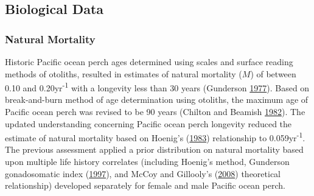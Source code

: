 \documentclass[12pt,]{article}
\begin{document}
\subsection{Biological Data}\label{biological-data}

\subsubsection{Natural Mortality}\label{natural-mortality}

Historic Pacific ocean perch ages determined using scales and surface
reading methods of otoliths, resulted in estimates of natural mortality
(\(M\)) of between 0.10 and 0.20yr\textsuperscript{-1} with a longevity
less than 30 years (Gunderson
\protect\hyperlink{ref-gunderson_population_1977}{1977}). Based on
break-and-burn method of age determination using otoliths, the maximum
age of Pacific ocean perch was revised to be 90 years (Chilton and
Beamish \protect\hyperlink{ref-chilton_age_1982}{1982}). The updated
understanding concerning Pacific ocean perch longevity reduced the
estimate of natural mortality based on Hoenig's
(\protect\hyperlink{ref-hoenig_empirical_1983}{1983}) relationship to
0.059yr\textsuperscript{-1}. The previous assessment applied a prior
distribution on natural mortality based upon multiple life history
correlates (including Hoenig's method, Gunderson gonadosomatic index
(\protect\hyperlink{ref-gunderson_trade-off_1997}{1997}), and McCoy and
Gillooly's (\protect\hyperlink{ref-mccoy_predicting_2008}{2008})
theoretical relationship) developed separately for female and male
Pacific ocean perch.
\end{document}
